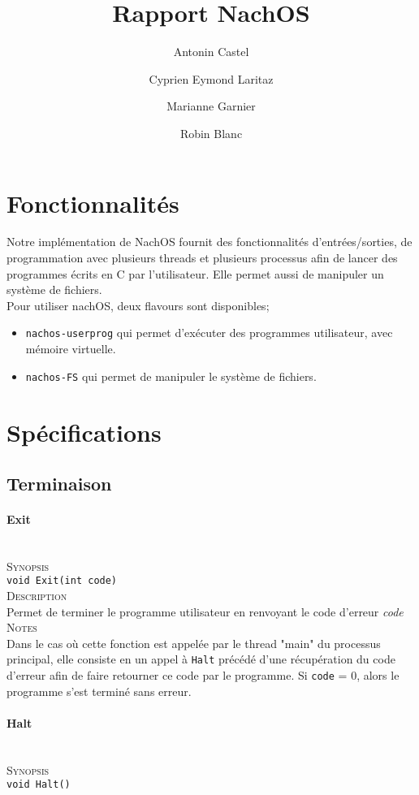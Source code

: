 \documentclass{report}
\title{Rapport NachOS}
\author{Antonin Castel \and
		Cyprien Eymond Laritaz \and
		Marianne Garnier \and
		Robin Blanc}
\newcommand{\myparagraph}[1]{\paragraph*{#1}\mbox{}\\}
\begin{document}
\maketitle

\section*{Fonctionnalités}
Notre implémentation de NachOS fournit des fonctionnalités d'entrées/sorties, de programmation avec plusieurs threads et plusieurs processus afin de lancer des programmes écrits en C par l'utilisateur.
Elle permet aussi de manipuler un système de fichiers.\\

Pour utiliser nachOS, deux flavours sont disponibles;
\begin{itemize}
 \item  \texttt{nachos-userprog} qui permet d'exécuter des programmes utilisateur, avec mémoire virtuelle.
 \item \texttt{nachos-FS} qui permet de manipuler le système de fichiers.
 \end{itemize}

\section*{Spécifications}


\subsection*{Terminaison}
\myparagraph{Exit}

\textsc{Synopsis}\\
	\texttt{void Exit(int code)}\\
	
\textsc{Description}\\
	Permet de terminer le programme utilisateur en renvoyant le code d'erreur \textit{code}\\
	
\textsc{Notes}\\
	Dans le cas où cette fonction est appelée par le thread "main" du processus principal, elle consiste en un appel à \texttt{Halt} précédé d'une récupération du code d'erreur afin de faire retourner ce code par le programme. Si \texttt{code} = 0, alors le programme s'est terminé sans erreur.
		
\myparagraph{Halt}

\textsc{Synopsis}\\
	\texttt{void Halt()}\\
	
\end{document}
